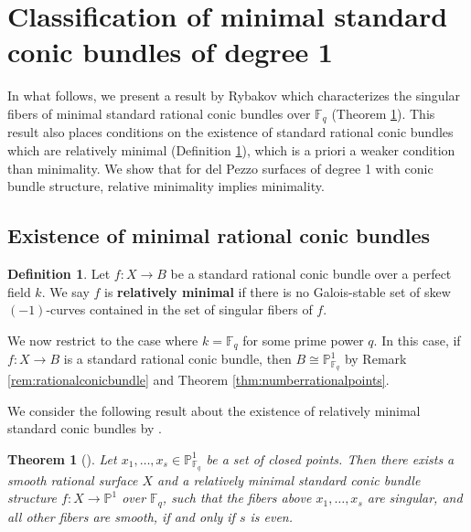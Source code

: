 \documentclass[a4paper, 11pt, reqno]{amsart}
\numberwithin{equation}{section} \numberwithin{figure}{section}
\newcommand{\term}[1]{\textbf{#1}}          %
\def \F {{\mathbb F}}
\def \P {{\mathbb P}}
\newcommand{\ra}{\rightarrow}
\newtheorem{theorem}[lemma]{Theorem}
\theoremstyle{definition}
\newtheorem{definition}[lemma]{Definition}
\numberwithin{lemma}{section}
\begin{document}
\section{Classification of minimal standard conic bundles of degree 1}\label{sec:typesCB}

In what follows, we present a result by Rybakov which characterizes the singular fibers of minimal standard rational conic bundles over $\F_q$ (Theorem \ref{thm:rybakov}). This result also places conditions on the existence of standard rational conic bundles which are relatively minimal (Definition \ref{def:relativelyminimal}), which is a priori a weaker condition than minimality. We show that for del Pezzo surfaces of degree 1 with conic bundle structure, relative minimality implies minimality.

\subsection{Existence of minimal rational conic bundles}\label{sec:rybakov}

\begin{definition}\label{def:relativelyminimal}
    Let $f \colon X \ra B$ be a standard rational conic bundle over a perfect field $k$. We say $f$ is \term{relatively minimal} if there is no Galois-stable set of skew $(-1)$-curves contained in the set of singular fibers of $f$. 
\end{definition}

We now restrict to the case where $k = \F_q$ for some prime power $q$. In this case, if $f \colon X \ra B$ is a standard rational conic bundle, then $B \cong \P^1_{\F_q}$ by Remark \ref{rem:rationalconicbundle} and Theorem \ref{thm:numberrationalpoints}.

We consider the following result about the existence of relatively minimal standard conic bundles by \cite{rybakov}. 

\begin{theorem}[{\cite[Theorem 2.11]{rybakov}}]\label{thm:rybakov}
Let $x_1, \ldots, x_s \in \P^1_{\F_q}$ be a set of closed points. Then there exists a smooth rational surface $X$ and a relatively minimal standard conic bundle structure $f \colon X \ra \P^1$ over $\F_q$, such that the fibers above $x_1, \ldots, x_s$ are singular, and all other fibers are smooth, if and only if $s$ is even.
\end{theorem}
\end{document}
